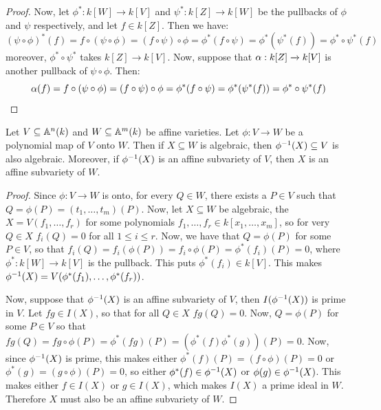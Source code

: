 \begin{proof}
  Now, let $\phi^*:k[W] \xrightarrow{} k[V]$ and $\psi^*:k[Z]
  \xrightarrow{} k[W]$ be the pullbacks of $\phi$ and $\psi$
  respectively, and let $f \in k[Z]$. Then we have:
  \begin{equation*}
    (\psi \circ \phi)^*(f)=f \circ (\psi \circ \phi)= (f \circ \psi)
    \circ \phi=\phi^*(f \circ \psi)=\phi^*(\psi^*(f))=\phi^* \circ
    \psi^*(f)
  \end{equation*}
  moreover, $\phi^* \circ \psi^*$ takes $k[Z] \xrightarrow{} k[V]$. Now,
  suppose that $\alpha:k[Z] \xrightarrow{} k[V]$ is another pullback of
  $\psi \circ \phi$. Then:
  \begin{equation*}
    \alpha(f)=f \circ (\psi \circ \phi)= (f \circ \psi) \circ \phi=
    \phi^*(f \circ \psi)=\phi^*(\psi^*(f))=\phi^* \circ \psi^*(f)
  \end{equation*}
\end{proof}

\begin{proposition}\label{proposition_11.1.8}
  Let $V \subseteq \mathbb{A}^n(k)$ and $W \subseteq \mathbb{A}^m(k)$ be affine
  varieties. Let $\phi:V \xrightarrow{} W$ be a polynomial map of $V$
  onto $W$. Then if $X \subseteq W$ is algebraic, then
  $\phi^{-1}(X) \subseteq V$ is also algebraic. Moreover, if
  $\phi^{-1}(X)$ is an affine subvariety of $V$, then $X$ is an
  affine subvariety of $W$.
\end{proposition}
\begin{proof}
  Since $\phi:V \xrightarrow{} W$ is onto, for every $Q \in W$,
  there exists a $P \in V$ such that $Q=\phi(P)=(t_1, \dots,
  t_m)(P)$. Now, let $X \subseteq W$ be algebraic, the $X=V(f_1,
  \dots, f_r)$ for some polynomials $f_1, \dots, f_r \in k[x_1,
  \dots, x_m]$, so for very $Q \in X$ $f_i(Q)=0$ for all $1 \leq i
  \leq r$. Now, we have that $Q=\phi(P)$ for some $P \in V$, so that
  $f_i(Q)=f_i(\phi(P))=f_i \circ \phi(P)=\phi^*(f_i)(P)=0$, where
  $\phi^*:k[W] \xrightarrow{} k[V]$ is the pullback. This
  puts $\phi^*(f_i) \in k[V]$. This makes $\phi^{-1}(X)=V(\phi^*(f_1),
  \dots, \phi^*(f_r))$.

  Now, suppose that $\phi^{-1}(X)$ is an affine subvariety of $V$,
  then  $I(\phi^{-1}(X))$ is prime in $V$. Let $fg \in I(X)$, so
  that for all $Q \in X$ $fg(Q)=0$. Now, $Q=\phi(P)$ for some $P \in
  V$ so that $fg(Q)=fg \circ
  \phi(P)=\phi^*(fg)(P)=(\phi^*(f)\phi^*(g))(P)=0$. Now, since
  $\phi^{-1}(X)$ is prime, this makes either $\phi^*(f)(P)=(f \circ
  \phi)(P)=0$ or $\phi^*(g)=(g \circ \phi)(P)=0$, so either $\phi^*(f)
  \in \phi^{-1}(X)$ or $\phi(g) \in \phi^{-1}(X)$. This makes
  either $f \in I(X)$ or $g \in I(X)$, which makes $I(X)$ a prime
  ideal in $W$. Therefore $X$ must also be an affine subvariety of
  $W$.
\end{proof}

